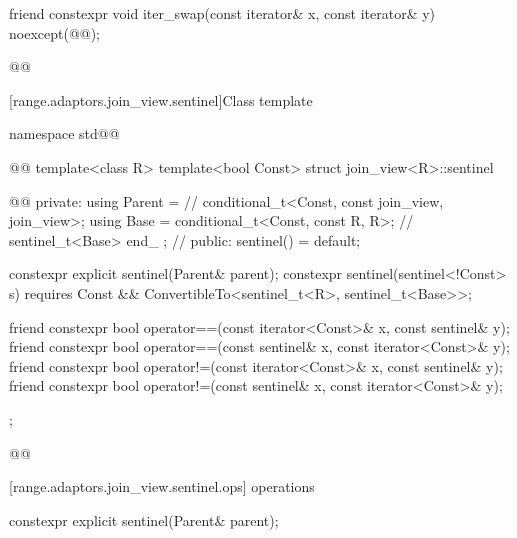{
\begin{itemdecl}
friend constexpr void iter_swap(const iterator& x, const iterator& y)
  noexcept(@\oldtxt{\seebelow}@);
\end{itemdecl}

\begin{itemdescr}
\pnum
\oldtxt{\returns} 

\pnum
{}
\begin{codeblock}
@@
\end{codeblock}
\end{itemdescr}

[range.adaptors.join_view.sentinel]{Class template }

\pnum
{}

\begin{codeblock}
namespace std@@ { @@
  template<class R>
  template<bool Const>
  struct join_view<R>::sentinel { @\newtxt{// \expos}@
  private:
    using Parent =                                   // \expos
      conditional_t<Const, const join_view, join_view>;
    using Base   = conditional_t<Const, const R, R>; // \expos
    sentinel_t<Base> end_ {};                        // \expos
  public:
    sentinel() = default;

    constexpr explicit sentinel(Parent& parent);
    constexpr sentinel(sentinel<!Const> s) requires Const &&
        ConvertibleTo<sentinel_t<R>, sentinel_t<Base>>;

    friend constexpr bool operator==(const iterator<Const>& x, const sentinel& y);
    friend constexpr bool operator==(const sentinel& x, const iterator<Const>& y);
    friend constexpr bool operator!=(const iterator<Const>& x, const sentinel& y);
    friend constexpr bool operator!=(const sentinel& x, const iterator<Const>& y);
  };
}@\oldtxt{\}}@
\end{codeblock}

[range.adaptors.join_view.sentinel.ops]{ operations}

\begin{itemdecl}
constexpr explicit sentinel(Parent& parent);
\end{itemdecl}

}
